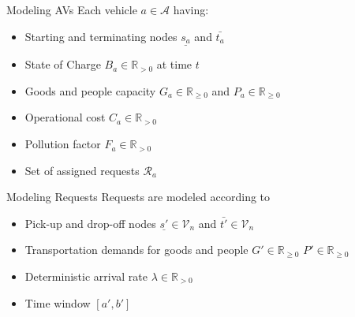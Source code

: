 
\begin{frame}{Modeling AVs}
	Each vehicle $a \in\mathcal{A}$ having: %
	\begin{itemize}
		\item Starting and terminating nodes $\underline{s_a}$ and $\bar{t_a}$ 
		\item  State of Charge $B_a \in \mathbb{R}_{>0}$ at time $t$
		\item  Goods and people capacity $G_a \in \mathbb{R}_{\ge0}$ and $P_a \in \mathbb{R}_{\ge0}$ 
		\item  Operational cost $C_a \in \mathbb{R}_{>0}$ 
		\item  Pollution factor $F_a \in \mathbb{R}_{>0}$
		\item Set of assigned requests $\mathcal{R}_a$ 
	\end{itemize}
\end{frame}




\begin{frame}{Modeling Requests}
	Requests are modeled according to%
	\begin{itemize}
		\item  Pick-up and drop-off nodes $\underline{s'} \in \mathcal{V}_n$ and $\bar{t'} \in \mathcal{V}_n$ 
		\item  Transportation demands for goods and people $G'\in \mathbb{R}_{\ge0}$ $P'\in \mathbb{R}_{\ge0}$ 
		\item  Deterministic arrival rate $\lambda \in \mathbb{R}_{>0}$ 
		\item  Time window $[a',b']$ 
	\end{itemize}
\end{frame}





